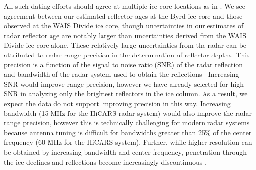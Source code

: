 All such dating efforts should agree at multiple ice core locations as in \citet{cavitte2016}. We see agreement between our estimated reflector ages at the Byrd ice core and those observed at the WAIS Divide ice core, though uncertainties in our estimates of radar reflector age are notably larger than uncertainties derived from the WAIS Divide ice core alone. These relatively large uncertainties from the radar can be attributed to radar range precision in the determination of reflector depths. This precision is a function of the signal to noise ratio (SNR) of the radar reflection and bandwidth of the radar system used to obtain the reflections \citep{cavitte2016}. Increasing SNR would improve range precision, however we have already selected for high SNR in analyzing only the brightest reflectors in the ice column. As a result, we expect the data do not support improving precision in this way. Increasing bandwidth (15 MHz for the HiCARS radar system) would also improve the radar range precision, however this is technically challenging for modern radar systems because antenna tuning is difficult for bandwidths greater than 25\% of the center frequency (60 MHz for the HiCARS system). Further, while higher resolution can be obtained by increasing bandwidth and center frequency, penetration through the ice declines and reflections become increasingly discontinuous \citep{cavitte2016}.






